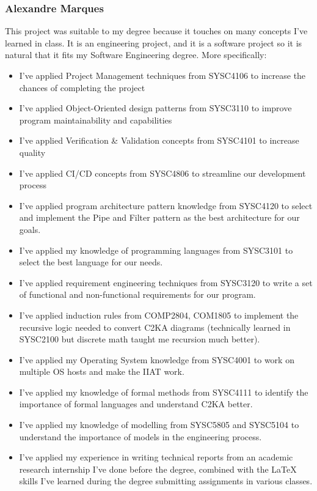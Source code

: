\subsubsection{Alexandre Marques}
This project was suitable to my degree because it touches on many concepts I've learned in class.
It is an engineering project, and it is a software project so it is natural that it fits my Software Engineering degree.
More specifically:
\begin{itemize}
    \item I've applied Project Management techniques from SYSC4106 to increase the chances of completing the project
    \item I've applied Object-Oriented design patterns from SYSC3110 to improve program maintainability and capabilities
    \item I've applied Verification \& Validation concepts from SYSC4101 to increase quality
    \item I've applied CI/CD concepts from SYSC4806 to streamline our development process
    \item I've applied program architecture pattern knowledge from SYSC4120 to select and implement the Pipe and Filter pattern as the best architecture for our goals.
    \item I've applied my knowledge of programming languages from SYSC3101 to select the best language for our needs.
    \item I've applied requirement engineering techniques from SYSC3120 to write a set of functional and non-functional requirements for our program.
    \item I've applied induction rules from COMP2804, COM1805 to implement the recursive logic needed to convert C2KA diagrams (technically learned in SYSC2100 but discrete math taught me recursion much better).
    \item I've applied my Operating System knowledge from SYSC4001 to work on multiple OS hosts and make the IIAT work.
    \item I've applied my knowledge of formal methods from SYSC4111 to identify the importance of formal languages and understand C2KA better.
    \item I've applied my knowledge of modelling from SYSC5805 and SYSC5104 to understand the importance of models in the engineering process.
    \item I've applied my experience in writing technical reports from an academic research internship I've done before the degree,
    combined with the LaTeX skills I've learned during the degree submitting assignments in various classes.

\end{itemize}
